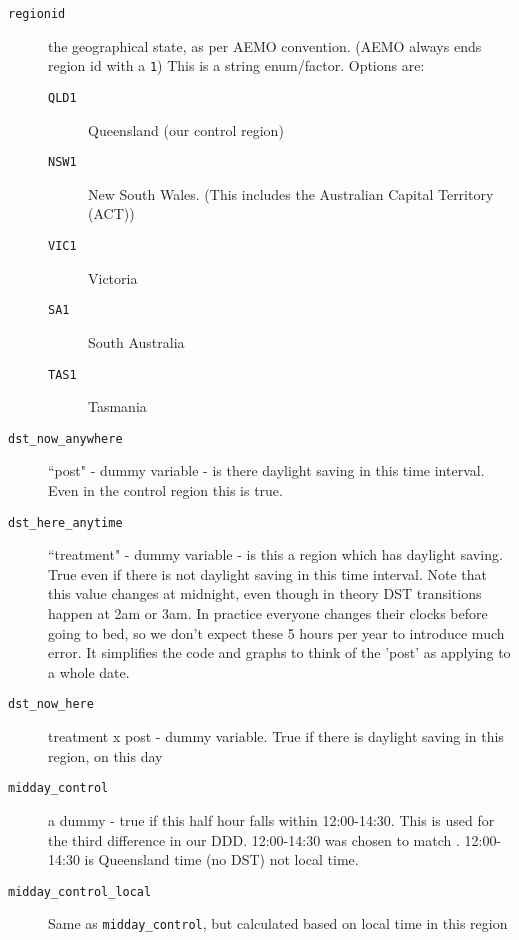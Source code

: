 \begin{description}
    \item[\texttt{regionid}] the geographical state, as per AEMO convention. (AEMO always ends region id with a \texttt{1}) This is a string enum/factor. Options are:
    \begin{description}
        \item[\texttt{QLD1}] Queensland (our control region)
        \item[\texttt{NSW1}] New South Wales. (This includes the Australian Capital Territory (ACT))
        \item[\texttt{VIC1}] Victoria
        \item[\texttt{SA1}] South Australia
        \item[\texttt{TAS1}] Tasmania
    \end{description}
    \item[\texttt{dst\_now\_anywhere}] ``post" - dummy variable - is there daylight saving in this time interval. Even in the control region this is true.
    \item[\texttt{dst\_here\_anytime}] ``treatment" - dummy variable -  is this a region which has daylight saving. True even if there is not daylight saving in this time interval. Note that this value changes at midnight, even though in theory \ac{DST} transitions happen at 2am or 3am. In practice everyone changes their clocks before going to bed, so we don't expect these 5 hours per year to introduce much error. It simplifies the code and graphs to think of the 'post' as applying to a whole date.
    \item[\texttt{dst\_now\_here}] treatment x post - dummy variable. True if there is daylight saving in this region, on this day
    \item[\texttt{midday\_control}] a dummy - true if this half hour falls within 12:00-14:30. This is used for the third difference in our \ac{DDD}. 12:00-14:30 was chosen to match \cite{kellogg_daylight_2008}. 12:00-14:30 is Queensland time (no \ac{DST}) not local time.
    \item[\texttt{midday\_control\_local}] Same as \texttt{midday\_control}, but calculated based on local time in this region
    

\end{description}
